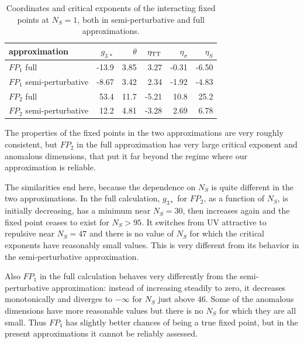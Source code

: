 \documentclass[11pt]{book} %
\begin{document}
\begin{table}[]
  \begin{center}
    \begin{tabular}{ l r r r r r }
      \toprule
      approximation            & $g_{3\,\ast}$ & $\theta$ & $\eta_{\rm TT}$ & $\eta_{\sigma}$ & $\eta_S$ \\
      \midrule
      $FP_1$ full              & -13.9         & 3.85     & 3.27            & -0.31           & -6.50 \\
      $FP_1$ semi-perturbative & -8.67         & 3.42     & 2.34            & -1.92           & -4.83 \\
      $FP_2$ full              & 53.4          & 11.7     & -5.21           & 10.8            & 25.2  \\
      $FP_2$ semi-perturbative & 12.2          & 4.81     & -3.28           & 2.69            & 6.78  \\
      \bottomrule
    \end{tabular}
  \end{center}
  \caption{
    Coordinates and critical exponents of the interacting fixed points at $N_S=1$,
    both in semi-perturbative and full approximations.
  }
  \label{FPtab3}
\end{table}


The properties of the fixed points in the two approximations
are very roughly consistent, but $FP_2$ in the full approximation
has very large critical exponent and anomalous dimensions,
that put it far beyond the regime where our approximation is reliable.


The similarities end here, because the dependence on $N_S$
is quite different in the two approximations.
In the full calculation, $g_{3*}$ for $FP_2$,
as a function of $N_S$, is initially decreasing,
has a minimum near $N_S=30$,
then increases again and the fixed point
ceases to exist for $N_S>95$.
It switches from UV attractive to repulsive near $N_S=47$
and there is no value of $N_S$ for which the critical exponents
have reasonably small values.
This is very different from its behavior in the semi-perturbative
approximation.

Also $FP_1$ in the full calculation behaves very differently from
the semi-perturbative approximation:
instead of increasing steadily to zero, it decreases monotonically
and diverges to $-\infty$ for $N_S$ just above $46$.
Some of the anomalous dimensions have more reasonable values
but there is no $N_S$ for which they are all small.
Thus $FP_1$ has slightly better chances of being
a true fixed point, but in the present approximations
it cannot be reliably assessed.
\end{document}
